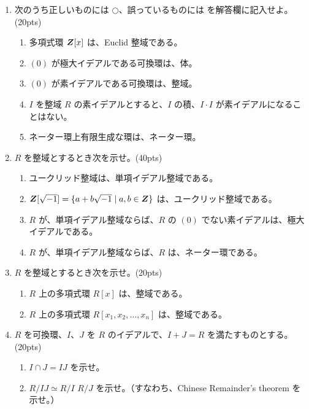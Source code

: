 \begin{enumerate}
\item 次のうち正しいものには $\bigcirc$、誤っているものには \bigx を解答欄に記入せよ。(20pts)
     \begin{enumerate}
     \item 多項式環 $\mbox{\boldmath $Z$}[x]$ は、Euclid 整域である。
     \item $(0)$ が極大イデアルである可換環は、体。
     \item $(0)$ が素イデアルである可換環は、整域。
     \item $I$ を整域 $R$ の素イデアルとすると、$I$ の積、$I\cdot I$ が素イデアルになることはない。
     \item ネーター環上有限生成な環は、ネーター環。
     \end{enumerate}

\medskip     
\item $R$ を整域とするとき次を示せ。(40pts)
     \begin{enumerate}
     \item ユークリッド整域は、単項イデアル整域である。
     \item $\mbox{\boldmath $Z$}[\sqrt{-1}] = \{a + b\sqrt{-1}\mid a, b\in \mbox{\boldmath $Z$}\}$ は、ユークリッド整域である。
     \item $R$ が、単項イデアル整域ならば、$R$ の $(0)$ でない素イデアルは、極大イデアルである。
     \item $R$ が、単項イデアル整域ならば、$R$ は、ネーター環である。
     \end{enumerate}

\medskip      
\item $R$ を整域とするとき次を示せ。(20pts)
     \begin{enumerate}
     \item $R$ 上の多項式環 $R[x]$ は、整域である。
     \item $R$ 上の多項式環 $R[x_1, x_2, \ldots, x_n]$ は、整域である。
     \end{enumerate}

\medskip     
\item $R$ を可換環、$I$、$J$ を $R$ のイデアルで、$I + J = R$ を満たすものとする。(20pts)
     \begin{enumerate}
     \item $I \cap J = IJ$ を示せ。
     \item $R/IJ \simeq R/I $ \bigx $R/J$ を示せ。（すなわち、Chinese Remainder's theorem を示せ。）
     \end{enumerate}


\end{enumerate}
